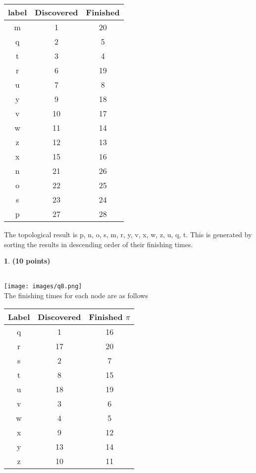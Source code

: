\documentclass[11pt]{article}
\theoremstyle{definition}
\newtheorem{prob}{}
\newcommand{\solution}{\medskip\noindent{\color{DarkBlue}\textbf{Solution:}}}
\begin{document}
\begin{tabular}{|c|c|c|}
    \hline
    label & Discovered & Finished  \\
    \hline
    m & 1 & 20 \\
    q & 2 & 5 \\
    t & 3 & 4 \\
    r & 6 & 19 \\
    u & 7 & 8 \\
    y & 9 & 18 \\
    v & 10 & 17 \\
    w & 11 & 14 \\
    z & 12 & 13 \\
    x & 15 & 16 \\
    n & 21 & 26 \\
    o & 22 & 25 \\
    s & 23 & 24 \\
    p & 27 & 28 \\
    
    \hline
\end{tabular}

The topological result is p, n, o, s, m, r, y, v, x, w, z, u, q, t. This is generated by sorting
the results in descending order of their finishing times.

\begin{prob} \textbf{(10 points)}
\end{prob}

\solution \\

\texttt{[image: images/q8.png]}
\\
The finishing times for each node are as follows
\\
\begin{tabular}{|c|c|c|}
    \hline
    Label & Discovered & Finished $\pi$ \\
    \hline
    q & 1 & 16 \\
    r & 17 & 20 \\
    s & 2 & 7 \\
    t & 8 & 15 \\
    u & 18 & 19 \\
    v & 3 & 6 \\
    w & 4 & 5 \\
    x & 9 & 12 \\
    y & 13 & 14 \\
    z & 10 & 11 \\
    
    \hline
\end{tabular}
\end{document}
